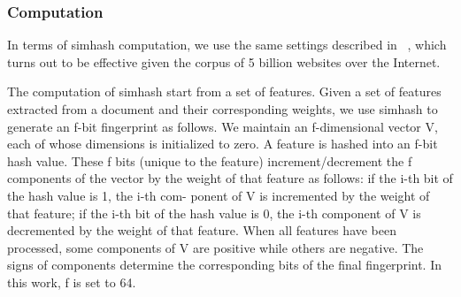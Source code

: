 

%

\subsubsection{Computation}
In terms of simhash computation, we use the same settings described in 
~\cite{manku2007detecting}, which turns out to be effective given the corpus of
5 billion websites over the Internet.

The computation of simhash start from a set of features.
Given a set of features extracted from a document and their corresponding
weights, we use simhash to generate an f-bit fingerprint as follows. We maintain
an f-dimensional vector V, each of whose dimensions is initialized to zero.
A feature is hashed into an f-bit hash value. These f bits (unique to the
feature) increment/decrement the f components of the vector by the weight of
that feature as follows: if the i-th bit of the hash value is 1, the i-th com-
ponent of V is incremented by the weight of that feature; if the i-th bit of the
hash value is 0, the i-th component of V is decremented by the weight of that
feature. When all features have been processed, some components of V are
positive while others are negative. The signs of components determine the
corresponding bits of the final fingerprint.
In this work, f is set to 64.

